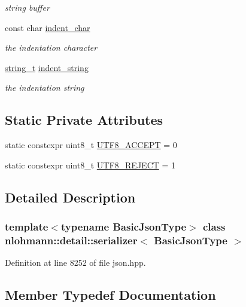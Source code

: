 \begin{DoxyCompactItemize}
\begin{DoxyCompactList}\small\item\em string buffer \end{DoxyCompactList}\item 
const char \hyperlink{classnlohmann_1_1detail_1_1serializer_a9a55e6b028d09676fe35aefa0c72ea5b}{indent\+\_\+char}
\begin{DoxyCompactList}\small\item\em the indentation character \end{DoxyCompactList}\item 
\hyperlink{classnlohmann_1_1detail_1_1serializer_ad08aa54fac1dd0a453320c54137d45ba}{string\+\_\+t} \hyperlink{classnlohmann_1_1detail_1_1serializer_ae9268a10d88a5526e32735a55a132fc6}{indent\+\_\+string}
\begin{DoxyCompactList}\small\item\em the indentation string \end{DoxyCompactList}\end{DoxyCompactItemize}
\subsection*{Static Private Attributes}
\begin{DoxyCompactItemize}
\item 
static constexpr uint8\+\_\+t \hyperlink{classnlohmann_1_1detail_1_1serializer_a52898111c3bbd130b2481dbef93c7292}{U\+T\+F8\+\_\+\+A\+C\+C\+E\+PT} = 0
\item 
static constexpr uint8\+\_\+t \hyperlink{classnlohmann_1_1detail_1_1serializer_a6bcc08c64319454fb9d72c3f438efee1}{U\+T\+F8\+\_\+\+R\+E\+J\+E\+CT} = 1
\end{DoxyCompactItemize}


\subsection{Detailed Description}
\subsubsection*{template$<$typename Basic\+Json\+Type$>$\newline
class nlohmann\+::detail\+::serializer$<$ Basic\+Json\+Type $>$}



Definition at line 8252 of file json.\+hpp.



\subsection{Member Typedef Documentation}
\mbox{\label{classnlohmann_1_1detail_1_1serializer_a460c6794fbabbb2ae83380e987a6c030}} 
